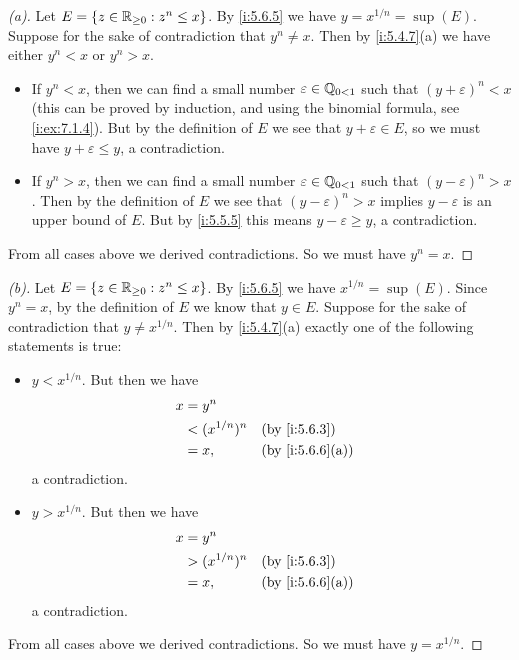 \begin{proof}[(a)]
  Let \(E = \left\lbrace z \in \mathbb{R}_{\geq 0} : z^n \leq x\right\rbrace\).
  By \cref{i:5.6.5} we have \(y = x^{1 / n} = \sup(E)\).
  Suppose for the sake of contradiction that \(y^n \neq x\).
  Then by \cref{i:5.4.7}(a) we have either \(y^n < x\) or \(y^n > x\).
  \begin{itemize}
    \item If \(y^n < x\), then we can find a small number \(\varepsilon \in \mathbb{Q}_{0 < 1}\) such that \((y + \varepsilon)^n < x\)
          (this can be proved by induction, and using the binomial formula, see \cref{i:ex:7.1.4}).
          But by the definition of \(E\) we see that \(y + \varepsilon \in E\), so we must have \(y + \varepsilon \leq y\), a contradiction.
    \item If \(y^n > x\), then we can find a small number \(\varepsilon \in \mathbb{Q}_{0 < 1}\) such that \((y - \varepsilon)^n > x\).
          Then by the definition of \(E\) we see that \((y - \varepsilon)^n > x\) implies \(y - \varepsilon\) is an upper bound of \(E\).
          But by \cref{i:5.5.5} this means \(y - \varepsilon \geq y\), a contradiction.
  \end{itemize}
  From all cases above we derived contradictions.
  So we must have \(y^n = x\).
\end{proof}

\begin{proof}[(b)]
  Let \(E = \left\lbrace z \in \mathbb{R}_{\geq 0} : z^n \leq x\right\rbrace\).
  By \cref{i:5.6.5} we have \(x^{1 / n} = \sup(E)\).
  Since \(y^n = x\), by the definition of \(E\) we know that \(y \in E\).
  Suppose for the sake of contradiction that \(y \neq x^{1 / n}\).
  Then by \cref{i:5.4.7}(a) exactly one of the following statements is true:
  \begin{itemize}
    \item \(y < x^{1 / n}\).
          But then we have
          \begin{align*}
            x & = y^n                                \\
              & < (x^{1 / n})^n &  & \by{i:5.6.3}    \\
              & = x,            &  & \by{i:5.6.6}[a]
          \end{align*}
          a contradiction.
    \item \(y > x^{1 / n}\).
          But then we have
          \begin{align*}
            x & = y^n                                \\
              & > (x^{1 / n})^n &  & \by{i:5.6.3}    \\
              & = x,            &  & \by{i:5.6.6}[a]
          \end{align*}
          a contradiction.
  \end{itemize}
  From all cases above we derived contradictions.
  So we must have \(y = x^{1 / n}\).
\end{proof}

